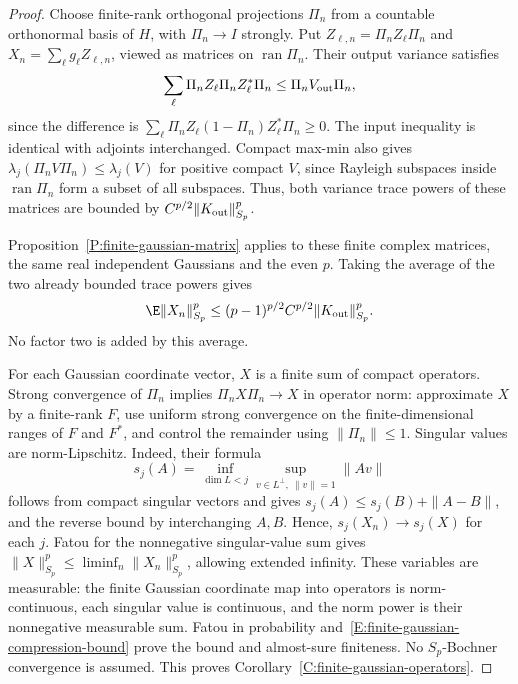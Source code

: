 \begin{proof}
  Choose finite-rank orthogonal projections $\Pi_n$ from a countable
  orthonormal basis of $H$, with $\Pi_n\to I$ strongly. Put
  $Z_{\ell,n}=\Pi_nZ_\ell\Pi_n$ and $X_n=\sum_\ell g_\ell Z_{\ell,n}$,
  viewed as matrices on $\operatorname{ran}\Pi_n$. Their output variance
  satisfies
  \[
    \sum_\ell\Pi_nZ_\ell\Pi_nZ_\ell^*\Pi_n
    \le\Pi_nV_{\rm out}\Pi_n,
  \]
  since the difference is
  $\sum_\ell\Pi_nZ_\ell(1-\Pi_n)Z_\ell^*\Pi_n\ge0$.
  The input inequality is identical with adjoints interchanged. Compact
  max-min also gives
  $\lambda_j(\Pi_nV\Pi_n)\le\lambda_j(V)$ for positive compact $V$,
  since Rayleigh subspaces inside $\operatorname{ran}\Pi_n$ form a subset
  of all subspaces. Thus, both variance trace powers of these matrices
  are bounded by $C^{p/2}\|K_{\rm out}\|_{S_p}^p$.

  Proposition~\ref{P:finite-gaussian-matrix} applies to these finite
  complex matrices, the same real independent Gaussians and the even $p$.
  Taking the average of the two already bounded trace powers gives
  \begin{equation}\label{E:finite-gaussian-compression-bound}
    \E\|X_n\|_{S_p}^p
    \le(p-1)^{p/2}C^{p/2}\|K_{\rm out}\|_{S_p}^p.
  \end{equation}
  No factor two is added by this average.

  For each Gaussian coordinate vector, $X$ is a finite sum of compact
  operators. Strong convergence of $\Pi_n$ implies $\Pi_nX\Pi_n\to X$
  in operator norm: approximate $X$ by a finite-rank $F$, use uniform
  strong convergence on the finite-dimensional ranges of $F$ and $F^*$,
  and control the remainder using $\|\Pi_n\|\le1$. Singular values are
  norm-Lipschitz. Indeed, their formula
  \[
    s_j(A)=\inf_{\dim L<j}
    \sup_{v\in L^\perp,\ \|v\|=1}\|Av\|
  \]
  follows from compact singular vectors and gives
  $s_j(A)\le s_j(B)+\|A-B\|$, and the reverse bound by interchanging $A,B$.
  Hence, $s_j(X_n)\to s_j(X)$ for each $j$. Fatou for the nonnegative
  singular-value sum gives
  $\|X\|_{S_p}^p\le\liminf_n\|X_n\|_{S_p}^p$, allowing extended infinity.
  These variables are measurable: the finite Gaussian coordinate map
  into operators is norm-continuous, each singular value is continuous,
  and the norm power is their nonnegative measurable sum. Fatou in
  probability and~\eqref{E:finite-gaussian-compression-bound} prove the
  bound and almost-sure finiteness. No $S_p$-Bochner convergence is assumed.
  This proves Corollary~\ref{C:finite-gaussian-operators}.
\end{proof}

